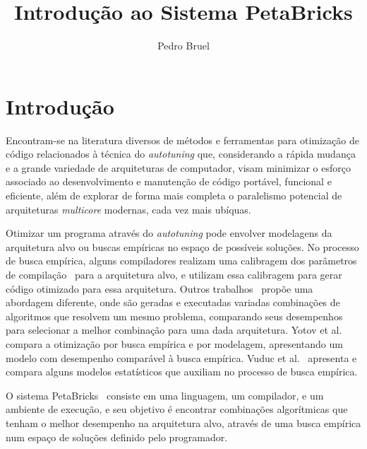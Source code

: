 \documentclass[a4paper, 11pt, twoside]{article}
\begin{document}
\hypersetup{backref,pdfpagemode=FullScreen,colorlinks=true}

\title{Introdução ao Sistema PetaBricks}
\author{Pedro Bruel}
\maketitle

%



\section{Introdução}

Encontram-se na literatura diversos de métodos e ferramentas para otimização de
código relacionados à técnica do \emph{autotuning} que, considerando a rápida 
mudança e a grande variedade de arquiteturas de computador, visam minimizar o 
esforço associado ao desenvolvimento e manutenção de código portável, funcional
e eficiente, além de explorar de forma mais completa o paralelismo potencial de
arquiteturas \emph{multicore} modernas, cada vez mais ubíquas.

Otimizar um programa através do \emph{autotuning} pode envolver modelagens da
arquitetura alvo ou buscas empíricas no espaço de possíveis soluções. No 
processo de busca empírica, alguns compiladores realizam uma calibragem dos 
parâmetros de compilação~\cite{whaley1998,yotov2003} para a arquitetura alvo,
e utilizam essa calibragem para gerar código otimizado para essa arquitetura. 
Outros trabalhos~\cite{goldman2012framework,mitcsail-tr:2014,vuduc2004} propõe
uma abordagem diferente, onde são geradas e executadas variadas combinações
de algoritmos que resolvem um mesmo problema, comparando seus desempenhos para
selecionar a melhor combinação para uma dada arquitetura.
Yotov et al.~\cite{yotov2003} compara a otimização por busca empírica e por 
modelagem, apresentando um modelo com desempenho comparável à busca empírica.
Vuduc et al.~\cite{vuduc2004} apresenta e compara alguns
modelos estatísticos que auxiliam no processo de busca empírica. 

O sistema PetaBricks~\cite{ansel2009petabricks, ansel2014phd, 
ansel:xrds:2010, mitcsail-tr:2014}
consiste em uma linguagem, um compilador, e um ambiente de execução,
e seu objetivo é encontrar combinações algorítmicas que tenham o melhor 
desempenho na arquitetura alvo, através de uma busca empírica num espaço
de soluções definido pelo programador.
\end{document}
